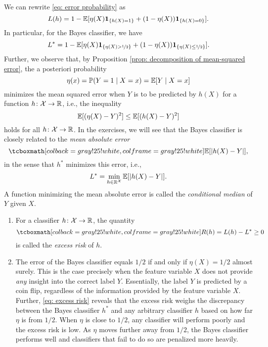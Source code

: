 \begin{remark}
We can rewrite \eqref{eq: error probability} as
\[
    L(h) = 1 - \Exp[\eta(X) \indSet{h(X) = 1} + (1 - \eta(X)) \indSet{h(X) = 0}].
\]
In particular, for the Bayes classifier, we have
\[
    L^* = 1 - \Exp[\eta(X) \indSet{\eta(X) > \nicefrac{1}{2}} + (1 - \eta(X)) \indSet{\eta(X) \leq \nicefrac{1}{2}}].
\]
Further, we observe that, by Proposition \ref{prop: decomposition of mean-squared error}, the a posteriori probability
\[
    \eta(x) = \mathbb{P}(Y = 1 \mathrel{|} X = x) = \operatorname{\mathbb{E}}[Y \mathrel{|} X = x]
\]
minimizes the mean squared error when $Y$ is to be predicted by $h(X)$ for a function $h \colon \mathcal{X} \to \mathbb{R}$, i.e., the inequality
\[
    \operatorname{\mathbb{E}}[(\eta(X) - Y)^2] \leq \operatorname{\mathbb{E}}[(h(X) - Y)^2]
\]
holds for all $h \colon \mathcal{X} \to \mathbb{R}$. In the exercises, we will see that the Bayes classifier is closely related to the \emph{mean absolute error}
\[
    \highlightMath{
        \Exp[\abs{h(X) - Y}],
    }
\]
in the sense that $h^*$ minimizes this error, i.e.,
\[
    L^* = \min_{h \in \mathbb{R}^{\mathcal{X}}} \operatorname{\mathbb{E}}[\abs{h(X) - Y}].
\]
A function minimizing the mean absolute error is called the \emph{conditional median} of $Y$ given $X$.
\end{remark}

\begin{remark}
    \begin{enumerate}
        \item For a classifier $h \colon \mathcal{X} \to \mathbb{R}$, the quantity
        \[
            \highlightMath{
                R(h) = L(h) - L^* \geq 0
            }
        \]
        is called the \emph{excess risk} of $h$.
        
        \item The error of the Bayes classifier equals $1/2$ if and only if $\eta(X) = 1/2$ almost surely. This is the case precisely when the feature variable $X$ does not provide \emph{any} insight into the correct label $Y$. Essentially, the label $Y$ is predicted by a coin flip, regardless of the information provided by the feature variable $X$. Further, \eqref{eq: excess risk} reveals that the excess risk weighs the discrepancy between the Bayes classifier $h^*$ and any arbitrary classifier $h$ based on how far $\eta$ is from $1/2$. When $\eta$ is close to $1/2$, any classifier will perform poorly and the excess risk is low. As $\eta$ moves further away from $1/2$, the Bayes classifier performs well and classifiers that fail to do so are penalized more heavily.
    \end{enumerate}
\end{remark}

